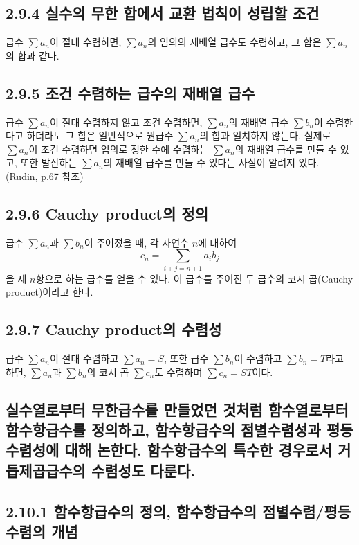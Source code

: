 \documentclass{article}
\begin{document}
\subsection*{\textmd{2.9.4 실수의 무한 합에서 교환 법칙이 성립할 조건}}
급수 \( \sum a_n \)이 절대 수렴하면, \( \sum a_n \)의 임의의 재배열 급수도 수렴하고, 그 합은 \( \sum a_n \)의 합과 같다.

\subsection*{\textmd{2.9.5 조건 수렴하는 급수의 재배열 급수}}
급수 \( \sum a_n \)이 절대 수렴하지 않고 조건 수렴하면, \( \sum a_n \)의 재배열 급수 \( \sum b_n \)이 수렴한다고 하더라도 그 합은 일반적으로 원급수 \( \sum a_n \)의 합과 일치하지 않는다. 
실제로 \( \sum a_n \)이 조건 수렴하면 임의로 정한 수에 수렴하는 \( \sum a_n \)의 재배열 급수를 만들 수 있고, 또한 발산하는 \( \sum a_n \)의 재배열 급수를 만들 수 있다는 사실이 알려져 있다. (Rudin, p.67 참조)

\subsection*{\textmd{2.9.6 Cauchy product의 정의}}
급수 \( \sum a_n \)과 \( \sum b_n \)이 주어졌을 때, 각 자연수 \( n \)에 대하여
\[ c_n = \sum_{i+j=n+1} a_i b_j \] 
을 제 \( n \)항으로 하는 급수를 얻을 수 있다. 이 급수를 주어진 두 급수의 코시 곱(Cauchy product)이라고 한다.

\subsection*{\textmd{2.9.7 Cauchy product의 수렴성}}
급수 \( \sum a_n \)이 절대 수렴하고 \( \sum a_n = S \), 또한 급수 \( \sum b_n \)이 수렴하고 \( \sum b_n = T \)라고 하면,
\( \sum a_n \)과 \( \sum b_n \)의 코시 곱 \( \sum c_n \)도 수렴하며 \( \sum c_n = ST \)이다.


\subsection{\fontsize{11.5}{13}\selectfont 
실수열로부터 무한급수를 만들었던 것처럼 함수열로부터 함수항급수를 정의하고, 함수항급수의 점별수렴성과 평등수렴성에 대해 논한다. 함수항급수의 특수한 경우로서 거듭제곱급수의 수렴성도 다룬다.}


\subsection*{\textmd{2.10.1 함수항급수의 정의, 함수항급수의 점별수렴/평등수렴의 개념}}
\end{document}
